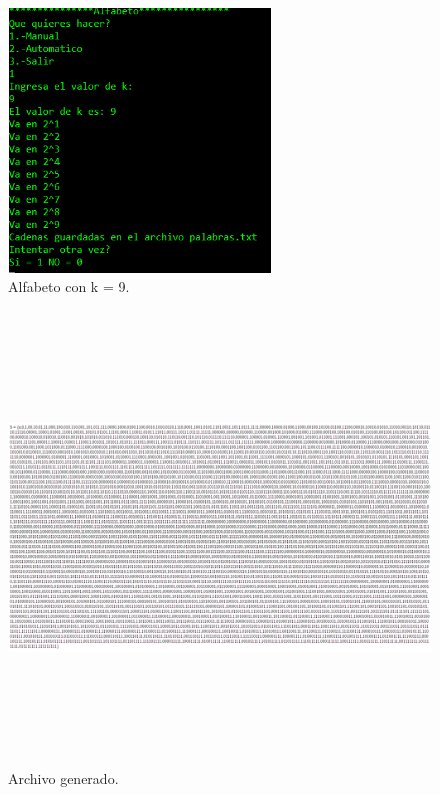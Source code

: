 	\begin{figure}[H]
		\begin{center}
			\includegraphics[width=7cm, height=7cm]{img/manual-alfabeto.png}
			\caption{Alfabeto con k = 9.}
			\label{fig:alfabeto3}
		\end{center}
	\end{figure}
	\begin{figure}[H]
		\begin{center}
			\includegraphics[width=\linewidth, height=12cm]{img/manual-alfabeto-salida.png}
			\caption{Archivo generado.}
			\label{fig:alfabeto4}
		\end{center}
	\end{figure}